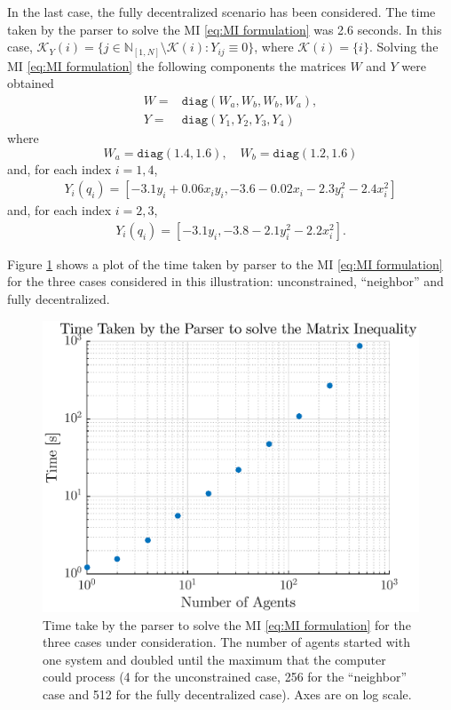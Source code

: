 \documentclass[10pt,twocolumn,twoside]{IEEEtran}
\theoremstyle{plain}
\theoremstyle{definition}
\theoremstyle{remark}
\begin{document}
In the last case, the fully decentralized scenario has been considered. The time taken by the parser to solve the MI \eqref{eq:MI formulation} was 2.6 seconds. In this case, $\mathscr{K}_Y(i)=\{j\in\mathbb{N}_{[1,N]}\setminus\mathscr{K}(i):Y_{ij}\equiv0\}$, where $\mathscr{K}(i)=\{i\}$. Solving the MI \eqref{eq:MI formulation} the following components the matrices $W$ and $Y$ were obtained
\begin{align*}
 W=&\mathbin{\mathtt{diag}}\left(W_a,W_b,W_b,W_a\right),\\
 Y=&\mathbin{\mathtt{diag}}\left(Y_1,Y_2,Y_3,Y_4\right)
\end{align*}
where
\begin{equation*}
		W_a=\mathbin{\mathtt{diag}}\left(
 1.4,1.6\right),\quad W_b=\mathbin{\mathtt{diag}}\left(1.2,1.6\right)
\end{equation*}
and, for each index $i=1,4$,
\begin{align*}
 Y_i(q_i)=[-3.1y_i+0.06x_iy_i,-3.6-0.02x_i-2.3y_i^2-2.4x_i^2]
\end{align*}
and, for each index $i=2,3$,
\begin{align*}
 Y_i(q_i)=[-3.1y_i,-3.8-2.1y_i^2-2.2x_i^2].
\end{align*}


Figure \ref{fig:time graph} shows a plot of the time taken by parser to the MI \eqref{eq:MI formulation} for the three cases considered in this illustration: unconstrained, ``neighbor'' and fully decentralized.

\begin{figure}[htpb!]
	\centering
	\includegraphics[width=\columnwidth]{./imgs/ParserTime}
	\caption{Time take by the parser to solve the MI \eqref{eq:MI formulation} for the three cases under consideration. The number of agents started with one system and doubled  until the maximum that the computer could process (4 for the unconstrained case, 256 for the ``neighbor'' case and 512 for the fully decentralized case). Axes are on log scale.}
	\label{fig:time graph}
\end{figure}
\end{document}

